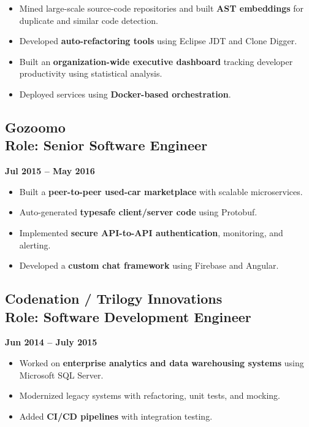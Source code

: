 \documentclass[11pt,letterpaper]{article}
\begin{document}
\begin{itemize}[leftmargin=*,noitemsep]
    \item Mined large-scale source-code repositories and built \textbf{AST embeddings} for duplicate and similar code detection.
    \item Developed \textbf{auto-refactoring tools} using Eclipse JDT and Clone Digger.
    \item Built an \textbf{organization-wide executive dashboard} tracking developer productivity using statistical analysis.
    \item Deployed services using \textbf{Docker-based orchestration}.
\end{itemize}

\subsection{Gozoomo \\ Role: Senior Software Engineer}
\hfill \textbf{Jul 2015 -- May 2016}

\begin{itemize}[leftmargin=*,noitemsep]
    \item Built a \textbf{peer-to-peer used-car marketplace} with scalable microservices.
    \item Auto-generated \textbf{typesafe client/server code} using Protobuf.
    \item Implemented \textbf{secure API-to-API authentication}, monitoring, and alerting.
    \item Developed a \textbf{custom chat framework} using Firebase and Angular.
\end{itemize}

\subsection{Codenation / Trilogy Innovations \\ Role: Software Development Engineer}
\hfill \textbf{Jun 2014 -- July 2015}

\begin{itemize}[leftmargin=*,noitemsep]
    \item Worked on \textbf{enterprise analytics and data warehousing systems} using Microsoft SQL Server.
    \item Modernized legacy systems with refactoring, unit tests, and mocking.
    \item Added \textbf{CI/CD pipelines} with integration testing.
\end{itemize}
\end{document}
